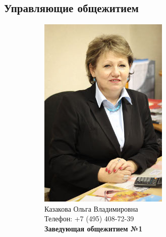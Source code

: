 \documentclass[14pt]{extarticle}
\begin{document}
\subsection{Управляющие общежитием}
\begin{figure}[h!]
\captionsetup[subfigure]{labelformat=empty,justification=centering,textfont=normalfont}
\captionsetup{labelformat=empty,justification=centering,textfont=normalfont}
    \begin{subfigure}[b]{0.5\linewidth}
        \centering
        \includegraphics[width=0.75\linewidth]{resources/kazak.jpg}
        \caption{Казакова Ольга Владимировна \\ Телефон: +7 (495) 408-72-39\\ \textbf{Заведующая общежитием №1}}
    \end{subfigure}
    \begin{subfigure}[b]{0.5\linewidth}
        \centering

\end{subfigure}
\end{figure}
\end{document}
